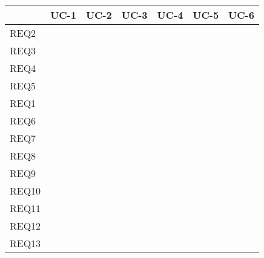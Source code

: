 \documentclass[11pt]{article}
\begin{document}
\begin{center}
\begin{tabular}{|l|l|l|l|l|l|l|}
\hline
& UC-1 & UC-2 & UC-3 & UC-4 & UC-5 & UC-6 \\ \hline
REQ2 &  &  &  &  &  &  \\ \hline
REQ3 &  &  &  &  &  &  \\ \hline
REQ4 &  &  &  &  &  &  \\ \hline
REQ5 &  &  &  &  &  &  \\ \hline
REQ1 &  &  &  &  &  &  \\  \hline
REQ6 &  &  &  &  &  &  \\ \hline
REQ7 &  &  &  &  &  &  \\ \hline
REQ8 &  &  &  &  &  &  \\ \hline
REQ9 &  &  &  &  &  &  \\ \hline
REQ10 &  &  &  &  &  &  \\ \hline
REQ11 &  &  &  &  &  &  \\ \hline
REQ12 &  &  &  &  &  &  \\ \hline
REQ13 &  &  &  &  &  & \\ \hline
\end{tabular}
\end{center}
\end{document}

